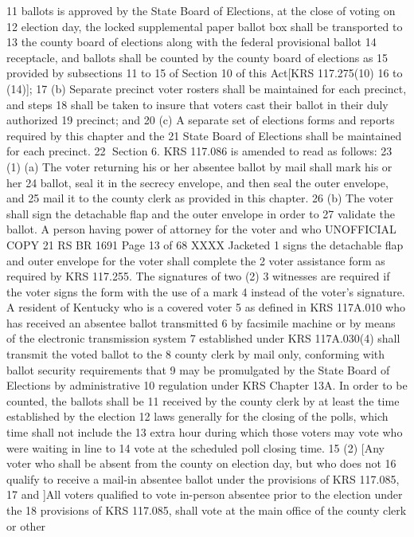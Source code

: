 11 ballots is approved by the State Board of Elections, at the close of voting on
12 election day, the locked supplemental paper ballot box shall be transported to
13 the county board of elections along with the federal provisional ballot
14 receptacle, and ballots shall be counted by the county board of elections as
15 provided by subsections 11 to 15 of Section 10 of this Act[KRS 117.275(10)
16 to (14)];
17 (b) Separate precinct voter rosters shall be maintained for each precinct, and steps
18 shall be taken to insure that voters cast their ballot in their duly authorized
19 precinct; and
20 (c) A separate set of elections forms and reports required by this chapter and the
21 State Board of Elections shall be maintained for each precinct.
22 Section 6. KRS 117.086 is amended to read as follows:
23 (1) (a) The voter returning his or her absentee ballot by mail shall mark his or her
24 ballot, seal it in the secrecy envelope, and then seal the outer envelope, and
25 mail it to the county clerk as provided in this chapter.
26 (b) The voter shall sign the detachable flap and the outer envelope in order to
27 validate the ballot. A person having power of attorney for the voter and who 
UNOFFICIAL COPY 21 RS BR 1691
Page 13 of 68
XXXX Jacketed
1 signs the detachable flap and outer envelope for the voter shall complete the
2 voter assistance form as required by KRS 117.255. The signatures of two (2)
3 witnesses are required if the voter signs the form with the use of a mark
4 instead of the voter's signature. A resident of Kentucky who is a covered voter
5 as defined in KRS 117A.010 who has received an absentee ballot transmitted
6 by facsimile machine or by means of the electronic transmission system
7 established under KRS 117A.030(4) shall transmit the voted ballot to the
8 county clerk by mail only, conforming with ballot security requirements that
9 may be promulgated by the State Board of Elections by administrative
10 regulation under KRS Chapter 13A. In order to be counted, the ballots shall be
11 received by the county clerk by at least the time established by the election
12 laws generally for the closing of the polls, which time shall not include the
13 extra hour during which those voters may vote who were waiting in line to
14 vote at the scheduled poll closing time.
15 (2) [Any voter who shall be absent from the county on election day, but who does not
16 qualify to receive a mail-in absentee ballot under the provisions of KRS 117.085,
17 and ]All voters qualified to vote in-person absentee prior to the election under the
18 provisions of KRS 117.085, shall vote at the main office of the county clerk or other
